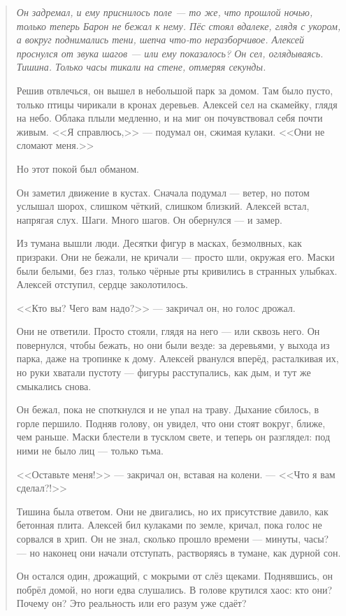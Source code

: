 \documentclass[12pt,a4paper]{book}
\newenvironment{dialogue}{\begin{quote}\itshape}{\end{quote}}
\begin{document}
\begin{dialogue}
Он задремал, и ему приснилось поле --- то же, что прошлой ночью, только теперь Барон не бежал к нему. Пёс стоял вдалеке, глядя с укором, а вокруг поднимались тени, шепча что-то неразборчивое. Алексей проснулся от звука шагов --- или ему показалось? Он сел, оглядываясь. Тишина. Только часы тикали на стене, отмеряя секунды.

Решив отвлечься, он вышел в небольшой парк за домом. Там было пусто, только птицы чирикали в кронах деревьев. Алексей сел на скамейку, глядя на небо. Облака плыли медленно, и на миг он почувствовал себя почти живым. <<Я справлюсь,>> --- подумал он, сжимая кулаки. <<Они не сломают меня.>>

Но этот покой был обманом.

Он заметил движение в кустах. Сначала подумал --- ветер, но потом услышал шорох, слишком чёткий, слишком близкий. Алексей встал, напрягая слух. Шаги. Много шагов. Он обернулся --- и замер.

Из тумана вышли люди. Десятки фигур в масках, безмолвных, как призраки. Они не бежали, не кричали --- просто шли, окружая его. Маски были белыми, без глаз, только чёрные рты кривились в странных улыбках. Алексей отступил, сердце заколотилось.

<<Кто вы? Чего вам надо?>> --- закричал он, но голос дрожал.

Они не ответили. Просто стояли, глядя на него --- или сквозь него. Он повернулся, чтобы бежать, но они были везде: за деревьями, у выхода из парка, даже на тропинке к дому. Алексей рванулся вперёд, расталкивая их, но руки хватали пустоту --- фигуры расступались, как дым, и тут же смыкались снова.

Он бежал, пока не споткнулся и не упал на траву. Дыхание сбилось, в горле першило. Подняв голову, он увидел, что они стоят вокруг, ближе, чем раньше. Маски блестели в тусклом свете, и теперь он разглядел: под ними не было лиц --- только тьма.

<<Оставьте меня!>> --- закричал он, вставая на колени. --- <<Что я вам сделал?!>>

Тишина была ответом. Они не двигались, но их присутствие давило, как бетонная плита. Алексей бил кулаками по земле, кричал, пока голос не сорвался в хрип. Он не знал, сколько прошло времени --- минуты, часы? --- но наконец они начали отступать, растворяясь в тумане, как дурной сон.

Он остался один, дрожащий, с мокрыми от слёз щеками. Поднявшись, он побрёл домой, но ноги едва слушались. В голове крутился хаос: кто они? Почему он? Это реальность или его разум уже сдаёт?


\end{dialogue}
\end{document}
